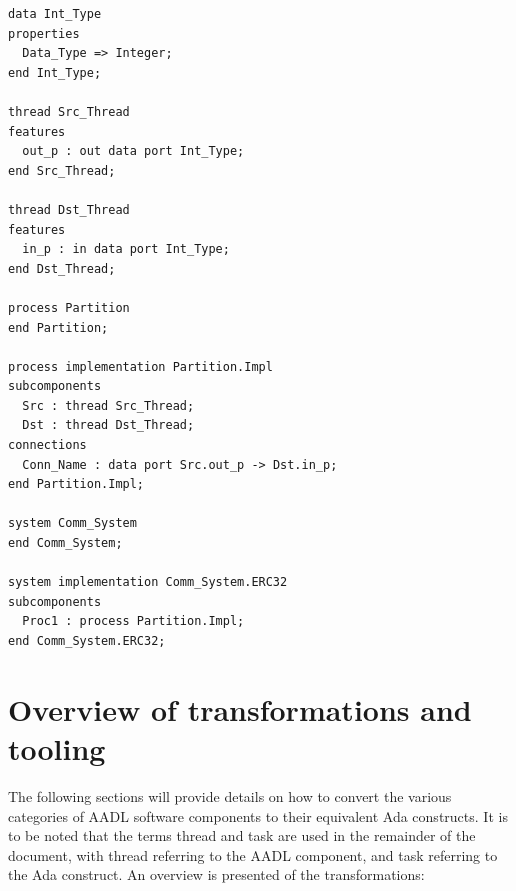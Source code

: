 \begin{minipage}[htbp]{\listingwidth}
\lstset{language=aadl}
\begin{lstlisting}[label=lst:aadl_ex, caption=AADL source for
    specification which contains the system implementation shown in
    Fig.~\ref{fig:aadl_ex}.]
data Int_Type
properties
  Data_Type => Integer;
end Int_Type;

thread Src_Thread
features
  out_p : out data port Int_Type;
end Src_Thread;

thread Dst_Thread
features
  in_p : in data port Int_Type;
end Dst_Thread;

process Partition
end Partition;

process implementation Partition.Impl
subcomponents
  Src : thread Src_Thread;
  Dst : thread Dst_Thread;
connections
  Conn_Name : data port Src.out_p -> Dst.in_p;
end Partition.Impl;

system Comm_System
end Comm_System;

system implementation Comm_System.ERC32
subcomponents
  Proc1 : process Partition.Impl;
end Comm_System.ERC32;
\end{lstlisting}
\end{minipage}

\section{Overview of transformations and tooling}
The following sections will provide details on how to convert the
various categories of AADL software components to their equivalent Ada
constructs. It is to be noted that the terms thread and task are used
in the remainder of the document, with thread referring to the AADL
component, and task referring to the Ada construct. An overview is
presented of the transformations:

